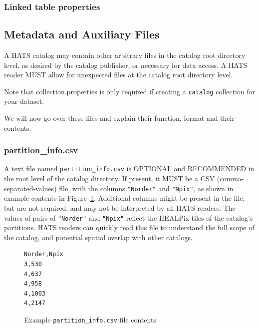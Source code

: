 \documentclass[11pt,a4paper]{ivoa}
\begin{document}
\subsubsection{Linked table properties} 


\subsection{Metadata and Auxiliary Files} \label{sec:meta}

A HATS catalog may contain other arbitrary files in the catalog root directory level, as desired by the catalog publisher, or necessary for data access.
A HATS reader MUST allow for unexpected files at the catalog root directory level.

Note that collection.properties is only required if creating a \texttt{catalog} collection for your dataset. \par 
We will now go over these files and explain their function, format and their contents. 

\subsubsection{partition\_info.csv} 

A text file named \texttt{partition\_info.csv} is OPTIONAL and RECOMMENDED in the root level of the catalog directory.
If present, it MUST be a CSV (comma-separated-values) file, with the columns \texttt{"Norder"} and \texttt{"Npix"}, as shown in example contents in Figure~\ref{fig:examplePartitionInfoCsv}.
Additional columns might be present in the file, but are not required, and may not be interpreted by all HATS readers.
The values of pairs of \texttt{"Norder"} and \texttt{"Npix"} reflect the HEALPix tiles of the catalog's partitions. 
HATS readers can quickly read this file to understand the full scope of the catalog, and potential spatial overlap with other catalogs.

\begin{figure}
\begin{minipage}{\linewidth}
\begin{lstlisting}
Norder,Npix
3,530
4,637
4,958
4,1003
4,2147
\end{lstlisting}
\end{minipage}
\caption{Example \texttt{partition\_info.csv} file contents}
\label{fig:examplePartitionInfoCsv}
\end{figure}
\end{document}
